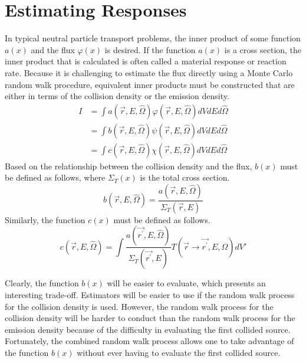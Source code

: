 \section{Estimating Responses}
In typical neutral particle transport problems, the inner product of some 
function $a(x)$ and the flux $\varphi(x)$ is desired. If the function $a(x)$ is
a cross section, the inner product that is calculated is often called a 
material response or reaction rate. Because it is challenging to estimate the
flux directly using a Monte Carlo random walk procedure, equivalent inner 
products must be constructed that are either in terms of the collision density 
or the emission density. 
\begin{align}
  I & = \int a(\vec{r},E,\hat{\Omega}) \varphi(\vec{r},E,\hat{\Omega}) 
  dVdEd\hat{\Omega} \\
  & = \int b(\vec{r},E,\hat{\Omega}) \psi(\vec{r},E,\hat{\Omega})  
  dVdEd\hat{\Omega} \\
  & = \int c(\vec{r},E,\hat{\Omega}) \chi(\vec{r},E,\hat{\Omega}) 
  dVdEd\hat{\Omega}
\end{align}
Based on the relationship between the collision density and the flux, $b(x)$
must be defined as follows, where $\Sigma_T(x)$ is the total cross section.
\begin{equation}
  b(\vec{r},E,\hat{\Omega}) = \frac{a(\vec{r},E,\hat{\Omega})}
  {\Sigma_T(\vec{r},E)}
  \label{eq:collision_response_function}
\end{equation}
Similarly, the function $c(x)$ must be defined as follows.
\begin{equation}
  c(\vec{r},E,\hat{\Omega}) = \int \frac{a(\vec{r^{'}},E,\hat{\Omega})}
  {\Sigma_T(\vec{r^{'}},E)} T(\vec{r} \to \vec{r^{'}},E,\Omega)dV'
  \label{eq:emission_response_function}
\end{equation}

Clearly, the function $b(x)$ will be easier to evaluate, which presents an 
interesting trade-off. Estimators will be easier to use if the random walk 
process for the collision density is used. However, the random walk process
for the collision density will be harder to conduct than the random walk 
process for the emission density because of the difficulty in evaluating the 
first collided source. Fortunately, the combined random walk process allows 
one to take advantage of the function $b(x)$ without ever having to evaluate
the first collided source. 


